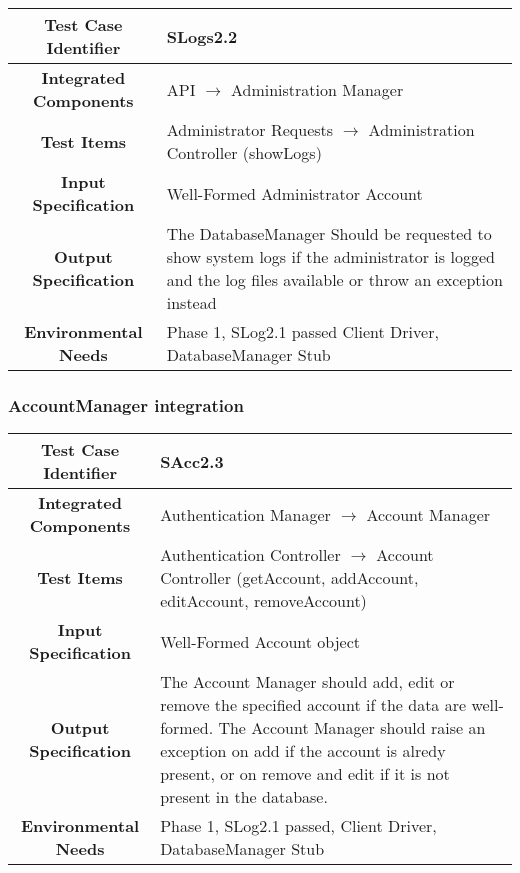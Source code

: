 \documentclass[11pt, a4paper,titlepage]{article}
\begin{document}
		  
		  \begin{tabularx}{\textwidth}{| c|X|}
		  	\hline \textbf{Test Case Identifier} & \label{SLogs2.2}SLogs2.2 \\
		  	\hline \textbf{Integrated Components} &  API $\rightarrow $ Administration Manager \\
		  	\hline \textbf{Test Items} &  Administrator Requests  $\rightarrow $ Administration Controller (showLogs)\\
		  	\hline \textbf{Input Specification} &  Well-Formed Administrator Account\\
		  	\hline \textbf{Output Specification} & The DatabaseManager Should be requested to show system logs if the administrator is logged and the log files available or throw an exception instead\\
		  	\hline \textbf{Environmental Needs} &  Phase 1, SLog2.1 passed \newline 
		  	Client Driver, DatabaseManager Stub\\
		  	\hline
		  \end{tabularx}
		  \newline
		 
		\subsubsection{AccountManager integration}
		 \begin{tabularx}{\textwidth}{| c|X|}
		 	\hline \textbf{Test Case Identifier} & \label{SAcc2.3}SAcc2.3 \\
		 	\hline \textbf{Integrated Components} &  Authentication Manager $\rightarrow $ Account Manager \\
		 	\hline \textbf{Test Items} &  Authentication Controller  $\rightarrow $ Account Controller (getAccount, addAccount, editAccount, removeAccount)\\
		 	\hline \textbf{Input Specification} &  Well-Formed Account object\\
		 	\hline \textbf{Output Specification} & The Account Manager should add, edit or remove the specified account if the data are well-formed. \newline The Account Manager should raise an exception on add if the account is alredy present, or on remove and edit if it is not present in the database.\\
		 	\hline \textbf{Environmental Needs} &  Phase 1, SLog2.1 passed, \newline 
		 	Client Driver, DatabaseManager Stub\\
		 	\hline
		 \end{tabularx}
		 \newline
		 
\end{document}
